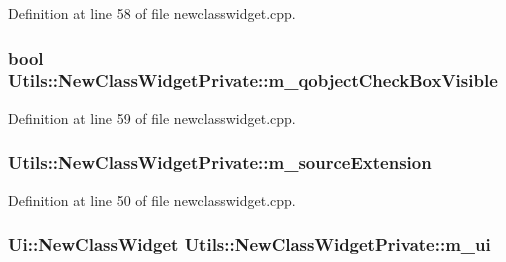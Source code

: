 \-Definition at line 58 of file newclasswidget.\-cpp.

\hypertarget{struct_utils_1_1_new_class_widget_private_ab1352df8bf86533b49c7554d73460407}{
\subsubsection[{m\-\_\-qobject\-Check\-Box\-Visible}]{\setlength{\rightskip}{0pt plus 5cm}bool {\bf \-Utils\-::\-New\-Class\-Widget\-Private\-::m\-\_\-qobject\-Check\-Box\-Visible}}}\label{struct_utils_1_1_new_class_widget_private_ab1352df8bf86533b49c7554d73460407}


\-Definition at line 59 of file newclasswidget.\-cpp.

\hypertarget{struct_utils_1_1_new_class_widget_private_a57663ba2bf51531e42dae77e2b9e9ee3}{
\subsubsection[{m\-\_\-source\-Extension}]{ {\bf \-Utils\-::\-New\-Class\-Widget\-Private\-::m\-\_\-source\-Extension}}}\label{struct_utils_1_1_new_class_widget_private_a57663ba2bf51531e42dae77e2b9e9ee3}


\-Definition at line 50 of file newclasswidget.\-cpp.

\hypertarget{struct_utils_1_1_new_class_widget_private_ac77c98af40bd07fd9d14e4f0e04a7bd5}{
\subsubsection[{m\-\_\-ui}]{\setlength{\rightskip}{0pt plus 5cm}\-Ui\-::\-New\-Class\-Widget {\bf \-Utils\-::\-New\-Class\-Widget\-Private\-::m\-\_\-ui}}}\label{struct_utils_1_1_new_class_widget_private_ac77c98af40bd07fd9d14e4f0e04a7bd5}


